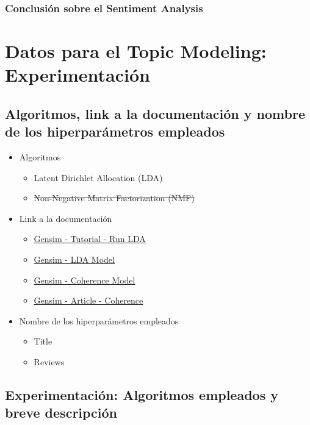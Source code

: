 \documentclass{report}
\begin{document}
            \subsection{Conclusión sobre el Sentiment Analysis}
    \chapter{Datos para el Topic Modeling: Experimentación}
        \section{Algoritmos, link a la documentación y nombre de los hiperparámetros empleados}
            \begin{itemize}
                \item Algoritmos
                \begin{itemize}
                    \item Latent Dirichlet Allocation (LDA)
                    \item \st{Non-Negative Matrix Factorization (NMF)}
                \end{itemize}
                \item Link a la documentación
                \begin{itemize}
                    \item \href{https://radimrehurek.com/gensim/auto_examples/tutorials/run_lda.html}{Gensim - Tutorial - Run LDA}
                    \item \href{https://radimrehurek.com/gensim/models/ldamodel.html}{Gensim - LDA Model}
                    \item \href{https://radimrehurek.com/gensim/models/coherencemodel.html}{Gensim - Coherence Model}
                    \item \href{https://gensimr.news-r.org/articles/coherence}{Gensim - Article - Coherence}
                \end{itemize}
                \item Nombre de los hiperparámetros empleados
                \begin{itemize}
                    \item Title
                    \item Reviews
                \end{itemize}
            \end{itemize}
        \clearpage\section{Experimentación: Algoritmos empleados y breve descripción}
\end{document}
